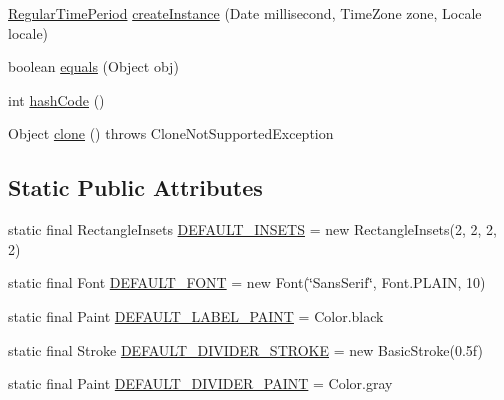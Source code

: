 \begin{DoxyCompactItemize}
\item 
\mbox{\hyperlink{classorg_1_1jfree_1_1data_1_1time_1_1_regular_time_period}{Regular\+Time\+Period}} \mbox{\hyperlink{classorg_1_1jfree_1_1chart_1_1axis_1_1_period_axis_label_info_a54d9b1e91ce898dbf6545b0e2ab43983}{create\+Instance}} (Date millisecond, Time\+Zone zone, Locale locale)
\item 
boolean \mbox{\hyperlink{classorg_1_1jfree_1_1chart_1_1axis_1_1_period_axis_label_info_af16e76fcb2d175cb9245e07518df45b0}{equals}} (Object obj)
\item 
int \mbox{\hyperlink{classorg_1_1jfree_1_1chart_1_1axis_1_1_period_axis_label_info_a448980b1e1a21c16cfb9031854ed48a5}{hash\+Code}} ()
\item 
Object \mbox{\hyperlink{classorg_1_1jfree_1_1chart_1_1axis_1_1_period_axis_label_info_a6540df0f95ff134ec289b9b29c8f5e1d}{clone}} ()  throws Clone\+Not\+Supported\+Exception 
\end{DoxyCompactItemize}
\subsection*{Static Public Attributes}
\begin{DoxyCompactItemize}
\item 
static final Rectangle\+Insets \mbox{\hyperlink{classorg_1_1jfree_1_1chart_1_1axis_1_1_period_axis_label_info_a8c85499ed5204efd34bbd2d34efba8c1}{D\+E\+F\+A\+U\+L\+T\+\_\+\+I\+N\+S\+E\+TS}} = new Rectangle\+Insets(2, 2, 2, 2)
\item 
static final Font \mbox{\hyperlink{classorg_1_1jfree_1_1chart_1_1axis_1_1_period_axis_label_info_a0e38e78af309316a39c2aa51c75ed711}{D\+E\+F\+A\+U\+L\+T\+\_\+\+F\+O\+NT}} = new Font(\char`\"{}Sans\+Serif\char`\"{}, Font.\+P\+L\+A\+IN, 10)
\item 
static final Paint \mbox{\hyperlink{classorg_1_1jfree_1_1chart_1_1axis_1_1_period_axis_label_info_ab7cd3c8701684e8c4a87cb19a8737e58}{D\+E\+F\+A\+U\+L\+T\+\_\+\+L\+A\+B\+E\+L\+\_\+\+P\+A\+I\+NT}} = Color.\+black
\item 
static final Stroke \mbox{\hyperlink{classorg_1_1jfree_1_1chart_1_1axis_1_1_period_axis_label_info_a36279f4e102d9ae1188ba73bf3268515}{D\+E\+F\+A\+U\+L\+T\+\_\+\+D\+I\+V\+I\+D\+E\+R\+\_\+\+S\+T\+R\+O\+KE}} = new Basic\+Stroke(0.\+5f)
\item 
static final Paint \mbox{\hyperlink{classorg_1_1jfree_1_1chart_1_1axis_1_1_period_axis_label_info_a94f8eaa774eb73ec58179f1881426fcf}{D\+E\+F\+A\+U\+L\+T\+\_\+\+D\+I\+V\+I\+D\+E\+R\+\_\+\+P\+A\+I\+NT}} = Color.\+gray
\end{DoxyCompactItemize}


